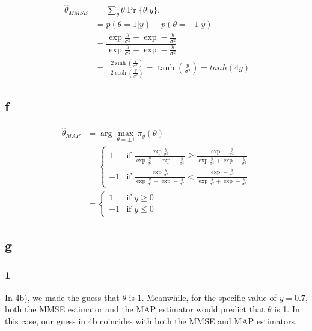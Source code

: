 \begin{equation}
    \begin{aligned}
        \:\hat{\theta}_{M M S E}&=\sum_{\theta}\theta\operatorname*{Pr}\{\theta|y\}.\:\\
        &=p(\theta=1|y)-p(\theta=-1|y)\\
        &=\dfrac{\exp\frac{y}{\sigma^2}-\exp-\frac{y}{\sigma^2}}{\exp\frac{y}{\sigma^2}+\exp-\frac{y}{\sigma^2}}\\
        &=\:\:\frac{2\sinh\left(\frac{y}{\sigma^2}\right)}{2\cosh\left(\frac{y}{\sigma^2}\right)}=\tanh\left(\frac{y}{\sigma^2}\right)=tanh(4y)\nonumber
    \end{aligned}
\end{equation}

\subsection{f}

\begin{equation}
    \begin{aligned}
        \hat{\theta}_{MAP}&=\arg\max\limits_{\theta=\pm1}\pi_y(\theta)\nonumber\\
        &=\begin{cases}1& \text{if } \frac{\exp\frac{y}{\sigma^2}}{\exp\frac{y}{\sigma^2}+\exp-\frac{y}{\sigma^2}}\geq\frac{\exp-\frac{y}{\sigma^2}}{\exp\frac{y}{\sigma^2}+\exp-\frac{y}{\sigma^2}}\\-1& \text{if } \frac{{\exp}\frac{y}{\sigma^2}}{\exp\frac{y}{\sigma^2}+\exp-\frac{y}{\sigma^2}}<\frac{{\exp}-\frac{y}{\sigma^2}}{\exp\frac{y}{\sigma^2}+\exp-\frac{y}{\sigma^2}}\end{cases}\\
        &=\begin{cases}1& \text{if } y\geq 0\\-1 & \text{if } y \leq 0 \end{cases}
    \end{aligned}
\end{equation}

\subsection{g}
\subsubsection{1}

In 4b), we made the guess that $\theta$ is 1. Meanwhile, for the specific value of $y=0.7$, both the MMSE estimator and the MAP estimator would predict that $\theta$ is 1. In this case, our guess in 4b coincides with both the MMSE and MAP estimators.

